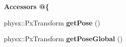 \begin{Indent}{\bf Accessors @\{}\par
\begin{DoxyCompactItemize}
\item 
\hypertarget{classNeb_1_1Scene_1_1Base_a9425aed0f7a62b57cc9e85838d3d8e93}{physx\-::\-Px\-Transform {\bfseries get\-Pose} ()}\label{classNeb_1_1Scene_1_1Base_a9425aed0f7a62b57cc9e85838d3d8e93}

\item 
\hypertarget{classNeb_1_1Scene_1_1Base_a9c063f947be2488466ded4657dc693e5}{physx\-::\-Px\-Transform {\bfseries get\-Pose\-Global} ()}\label{classNeb_1_1Scene_1_1Base_a9c063f947be2488466ded4657dc693e5}

\end{DoxyCompactItemize}
\end{Indent}
